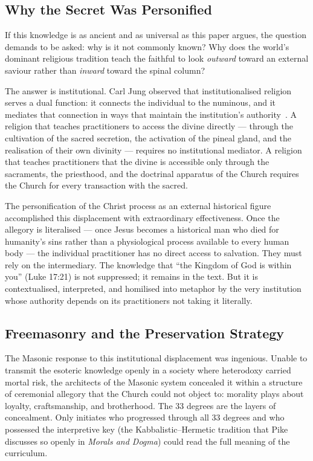\documentclass[12pt, a4paper]{article}
\begin{document}
\subsection{Why the Secret Was Personified}

If this knowledge is as ancient and as universal as this paper argues, the
question demands to be asked: why is it not commonly known? Why does the world's
dominant religious tradition teach the faithful to look \emph{outward} toward
an external saviour rather than \emph{inward} toward the spinal column?

The answer is institutional. Carl Jung observed that institutionalised religion
serves a dual function: it connects the individual to the numinous, and it
mediates that connection in ways that maintain the institution's
authority~\autocite[40]{jung1958}. A religion that teaches practitioners to
access the divine directly — through the cultivation of the sacred secretion, the
activation of the pineal gland, and the realisation of their own divinity —
requires no institutional mediator. A religion that teaches practitioners that
the divine is accessible only through the sacraments, the priesthood, and the
doctrinal apparatus of the Church requires the Church for every transaction
with the sacred.

The personification of the Christ process as an external historical figure
accomplished this displacement with extraordinary effectiveness. Once the
allegory is literalised — once Jesus becomes a historical man who died for
humanity's sins rather than a physiological process available to every human
body — the individual practitioner has no direct access to salvation. They
must rely on the intermediary. The knowledge that ``the Kingdom of God is
within you'' (Luke 17:21) is not suppressed; it remains in the text. But it is
contextualised, interpreted, and homilised into metaphor by the very
institution whose authority depends on its practitioners not taking it
literally.

\subsection{Freemasonry and the Preservation Strategy}

The Masonic response to this institutional displacement was ingenious. Unable
to transmit the esoteric knowledge openly in a society where heterodoxy carried
mortal risk, the architects of the Masonic system concealed it within a
structure of ceremonial allegory that the Church could not object to: morality
plays about loyalty, craftsmanship, and brotherhood. The 33 degrees are the
layers of concealment. Only initiates who progressed through all 33 degrees
and who possessed the interpretive key (the Kabbalistic--Hermetic tradition
that Pike discusses so openly in \emph{Morals and Dogma}) could read the full
meaning of the curriculum.
\end{document}
